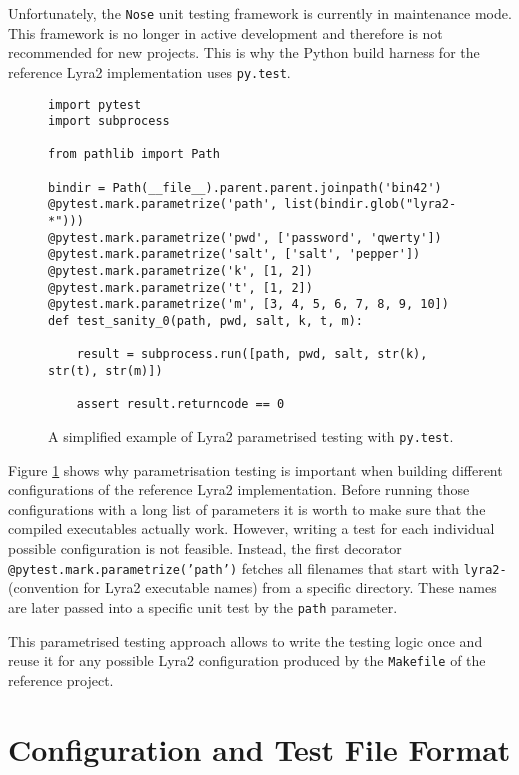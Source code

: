 Unfortunately, the \texttt{Nose} unit testing framework is currently in maintenance mode. This framework is no longer in active development and therefore is not recommended for new projects. This is why the Python build harness for the reference Lyra2 implementation uses \texttt{py.test}.

\begin{figure}
\begin{verbatim}
import pytest
import subprocess

from pathlib import Path

bindir = Path(__file__).parent.parent.joinpath('bin42')
@pytest.mark.parametrize('path', list(bindir.glob("lyra2-*")))
@pytest.mark.parametrize('pwd', ['password', 'qwerty'])
@pytest.mark.parametrize('salt', ['salt', 'pepper'])
@pytest.mark.parametrize('k', [1, 2])
@pytest.mark.parametrize('t', [1, 2])
@pytest.mark.parametrize('m', [3, 4, 5, 6, 7, 8, 9, 10])
def test_sanity_0(path, pwd, salt, k, t, m):

    result = subprocess.run([path, pwd, salt, str(k), str(t), str(m)])

    assert result.returncode == 0
\end{verbatim}
\caption{A simplified example of Lyra2 parametrised testing with \texttt{py.test}.}
\label{fig:pytest-parametrization}
\end{figure}

Figure \ref{fig:pytest-parametrization} shows why parametrisation testing is important when building different configurations of the reference Lyra2 implementation. Before running those configurations with a long list of parameters it is worth to make sure that the compiled executables actually work. However, writing a test for each individual possible configuration is not feasible. Instead, the first decorator \texttt{@pytest.mark.parametrize('path')} fetches all filenames that start with \texttt{lyra2-} (convention for Lyra2 executable names) from a specific directory. These names are later passed into a specific unit test by the \texttt{path} parameter.

This parametrised testing approach allows to write the testing logic once and reuse it for any possible Lyra2 configuration produced by the \texttt{Makefile} of the reference project.

\section{Configuration and Test File Format}
\label{sec:configuration-and-test-file-format}


